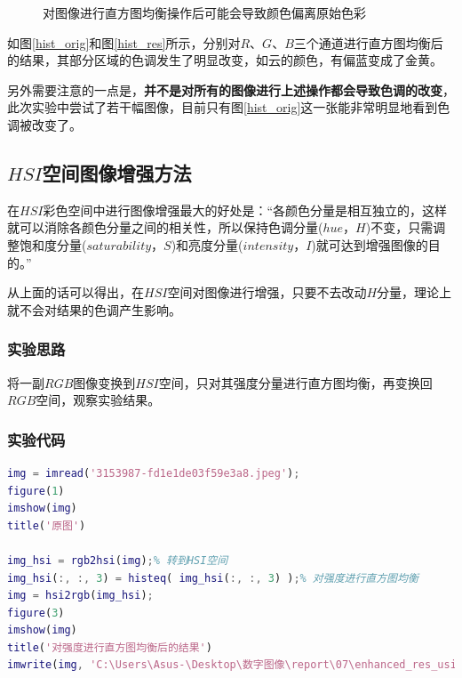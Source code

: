 \documentclass[UTF8]{ctexart}
\begin{document}
\begin{figure}[H]
                                       \caption{对图像进行直方图均衡操作后可能会导致颜色偏离原始色彩\protect\footnotemark[1]}
                                       \label{butterworth}
                                   \end{figure}
            
            \indent 如图\ref{hist_orig}和图\ref{hist_res}所示，分别对$R$、$G$、$B$三个通道进行直方图均衡后的结果，其部分区域的色调发生了明显改变，如云的颜色，有偏蓝变成了金黄。
            
            \indent 另外需要注意的一点是，\textbf{并不是对所有的图像进行上述操作都会导致色调的改变}，此次实验中尝试了若干幅图像，目前只有图\ref{hist_orig}这一张能非常明显地看到色调被改变了。
            
        
        \subsection{$HSI$空间图像增强方法}
        
            \indent 在$HSI$彩色空间中进行图像增强最大的好处是\cite{song2017基于HSI}：“各颜色分量是相互独立的，这样就可以消除各颜色分量之间的相关性，所以保持色调分量($hue，H$)不变，只需调整饱和度分量($saturability，S$)和亮度分量($intensity，I$)就可达到增强图像的目的。”
            
            \indent 从上面的话可以得出，在$HSI$空间对图像进行增强，只要不去改动$H$分量，理论上就不会对结果的色调产生影响。
            \subsubsection{实验思路}
                \indent 将一副$RGB$图像变换到$HSI$空间，只对其强度分量进行直方图均衡，再变换回$RGB$空间，观察实验结果。
            
            \subsubsection{实验代码}
\begin{lstlisting}[language=Matlab,caption={在$HST$彩色空间对强度分量做直方图均衡\protect\footnotemark[1]}]
% 读取图像显示原图
img = imread('3153987-fd1e1de03f59e3a8.jpeg');
figure(1)
imshow(img)
title('原图')

img_hsi = rgb2hsi(img);% 转到HSI空间
img_hsi(:, :, 3) = histeq( img_hsi(:, :, 3) );% 对强度进行直方图均衡
img = hsi2rgb(img_hsi);
figure(3)
imshow(img)
title('对强度进行直方图均衡后的结果')
imwrite(img, 'C:\Users\Asus-\Desktop\数字图像\report\07\enhanced_res_using_hsi.png')
       \end{lstlisting}   
       
\end{document}
